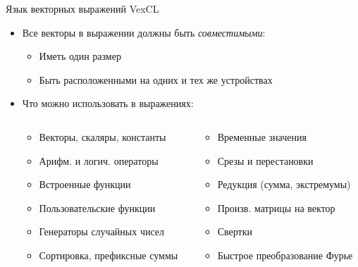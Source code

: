 \documentclass[@BEAMER_OPTIONS@]{beamer}
\begin{document}
\begin{frame}[fragile]{Язык векторных выражений VexCL}
    \begin{itemize}
        \item Все векторы в выражении должны быть \emph{совместимыми}:
            \begin{itemize}
                \item Иметь один размер
                \item Быть расположенными на одних и тех же устройствах
            \end{itemize}
        \item Что можно использовать в выражениях:
            \begin{columns}
                \begin{column}{0.4\textwidth}
                    \begin{itemize}
                        \item Векторы, скаляры, константы
                        \item Арифм. и логич. операторы
                        \item Встроенные функции
                        \item Пользовательские функции
                        \item Генераторы случайных чисел
                        \item Сортировка, префиксные суммы
                    \end{itemize}
                \end{column}
                \begin{column}{0.4\textwidth}
                    \begin{itemize}
                        \item Временные значения
                        \item Срезы и перестановки
                        \item Редукция (сумма, экстремумы)
                        \item Произв. матрицы на вектор
                        \item Свертки
                        \item Быстрое преобразование Фурье
                    \end{itemize}
                \end{column}
            \end{columns}
    \end{itemize}
\end{frame}
\end{document}
